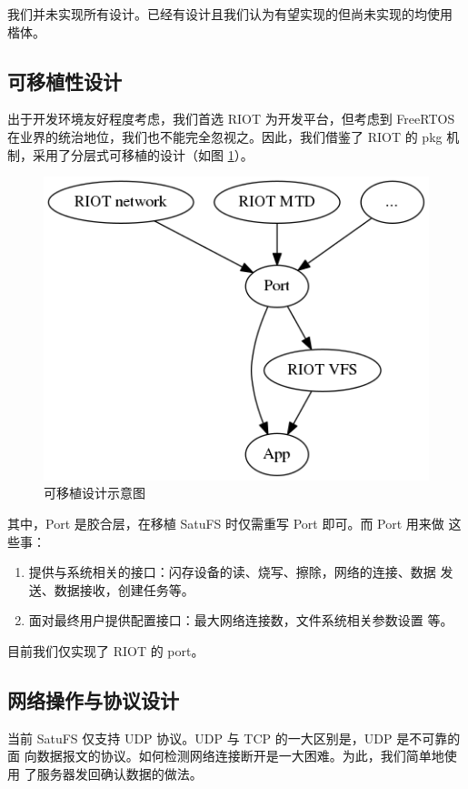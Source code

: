 \documentclass{ctexart}
\begin{document}
我们并未实现所有设计。已经有设计且我们认为有望实现的但尚未实现的均使用
楷体。

\subsection{可移植性设计}
\label{sec:port}

出于开发环境友好程度考虑，我们首选 RIOT 为开发平台，但考虑到 FreeRTOS
在业界的统治地位，我们也不能完全忽视之。因此，我们借鉴了 RIOT 的 pkg 机
制，采用了分层式可移植的设计（如图 \ref{fig:port}）。

\begin{figure}
  \centering
  \includegraphics[scale=0.4]{portability1.png}
  \caption{可移植设计示意图}
  \label{fig:port}
\end{figure}

其中，Port 是胶合层，在移植 SatuFS 时仅需重写 Port 即可。而 Port 用来做
这些事：

\begin{enumerate}
\item 提供与系统相关的接口：闪存设备的读、烧写、擦除，网络的连接、数据
  发送、数据接收，创建任务等。
\item 面对最终用户提供配置接口：最大网络连接数，文件系统相关参数设置
  等。
\end{enumerate}

目前我们仅实现了 RIOT 的 port。

\subsection{网络操作与协议设计}
\label{sec:network}

当前 SatuFS 仅支持 UDP 协议。UDP 与 TCP 的一大区别是，UDP 是不可靠的面
向数据报文的协议。如何检测网络连接断开是一大困难。为此，我们简单地使用
了服务器发回确认数据的做法。
\end{document}
